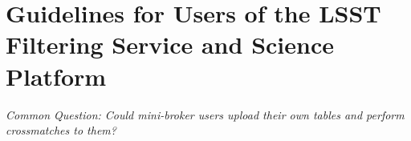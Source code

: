 \section{Guidelines for Users of the LSST Filtering Service and Science Platform}

{\it Common Question: Could mini-broker users upload their own tables and perform crossmatches to them?} 